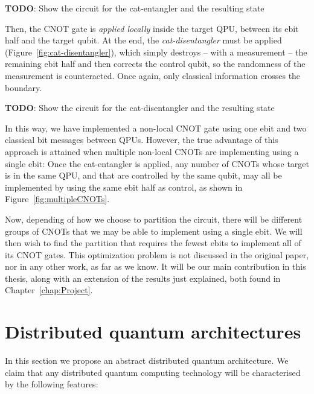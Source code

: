 \textbf{TODO}: Show the circuit for the cat-entangler and the resulting state

Then, the CNOT gate is \textit{applied locally} inside the target QPU, between its ebit half and the target qubit. At the end, the \textit{cat-disentangler} must be applied (Figure~\ref{fig:cat-disentangler}), which simply destroys -- with a measurement -- the remaining ebit half and then corrects the control qubit, so the randomness of the measurement is counteracted. Once again, only classical information crosses the boundary.

\textbf{TODO}: Show the circuit for the cat-disentangler and the resulting state

In this way, we have implemented a non-local CNOT gate using one ebit and two classical bit messages between QPUs. However, the true advantage of this approach is attained when multiple non-local CNOTs are implementing using a single ebit: Once the cat-entangler is applied, any number of CNOTs whose target is in the same QPU, and that are controlled by the same qubit, may all be implemented by using the same ebit half as control, as shown in Figure~\ref{fig:multipleCNOTs}.



Now, depending of how we choose to partition the circuit, there will be different groups of CNOTs that we may be able to implement using a single ebit. We will then wish to find the partition that requires the fewest ebits to implement all of its CNOT gates. This optimization problem is not discussed in the original paper, nor in any other work, as far as we know. It will be our main contribution in this thesis, along with an extension of the results just explained, both found in Chapter~\ref{chap:Project}.


\section{Distributed quantum architectures}
\label{DQC_Architecture} 

In this section we propose an abstract distributed quantum architecture. We claim that any distributed quantum computing technology will be characterised by the following features:

